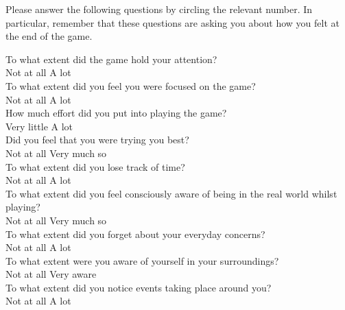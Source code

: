 \documentclass[../II2202-proposal.tex]{subfiles}
\begin{document}
Please answer the following questions by circling the relevant number.
In particular, remember that these questions are asking you about how you felt at the end of the game.

\vspace{5mm}

\noindent To what extent did the game hold your attention? \\
Not at all      \quad A lot
\vspace{2mm} \\
To what extent did you feel you were focused on the game? \\
Not at all      \quad A lot
\vspace{2mm} \\
How much effort did you put into playing the game? \\
Very little      \quad A lot
\vspace{2mm} \\
Did you feel that you were trying you best? \\
Not at all      \quad Very much so
\vspace{2mm} \\
To what extent did you lose track of time? \\
Not at all      \quad A lot
\vspace{2mm} \\
To what extent did you feel consciously aware of being in the real world whilst playing? \\
Not at all      \quad Very much so
\vspace{2mm} \\
To what extent did you forget about your everyday concerns? \\
Not at all      \quad A lot
\vspace{2mm} \\
To what extent were you aware of yourself in your surroundings? \\
Not at all      \quad Very aware
\vspace{2mm} \\
To what extent did you notice events taking place around you?  \\
Not at all      \quad A lot
\vspace{2mm} \\
\end{document}
